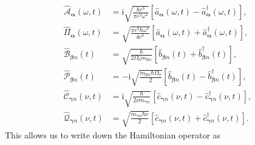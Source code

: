 \documentclass{article}
\begin{document}
\begin{equation}
\begin{split}
\hat{\mathcal{A}}_{\bm{\alpha}}(\omega,t) &= \mathrm{i}\sqrt{\frac{\hbar c^3}{\pi e^2\omega^2}}\left[\hat{a}_{\bm{\alpha}}(\omega,t) - \hat{a}_{\bm{\alpha}}^\dagger(\omega,t)\right],\\
\hat{\mathit{\Pi}}_{\bm{\alpha}}(\omega,t) &= \sqrt{\frac{\pi e^2\hbar\omega^2}{4 c^3}}\left[\hat{a}_{\bm{\alpha}}(\omega,t) + \hat{a}_{\bm{\alpha}}^\dagger(\omega,t)\right],\\[0.5em]
\hat{\mathcal{B}}_{\bm{\beta}n}(t) &= \sqrt{\frac{\hbar}{2\Omega_0m_{\bm{\beta}n}}}\left[\hat{b}_{\bm{\beta}n}(t) + \hat{b}_{\bm{\beta}n}^\dagger(t)\right],\\
\hat{\mathcal{P}}_{\bm{\beta}n}(t) &= -\mathrm{i}\sqrt{\frac{m_{\bm{\beta}n}\hbar\Omega_0}{2}}\left[\hat{b}_{\bm{\beta}n}(t) - \hat{b}_{\bm{\beta}n}^\dagger(t)\right],\\[0.5em]
\hat{\mathcal{C}}_{\bm{\gamma}n}(\nu,t) &= \mathrm{i}\sqrt{\frac{\hbar}{2\nu m_{\bm{\gamma}n}}}\left[\hat{c}_{\bm{\gamma}n}(\nu,t) - \hat{c}_{\bm{\gamma}n}^\dagger(\nu,t)\right],\\
\hat{\mathcal{Q}}_{\bm{\gamma}n}(\nu,t) &= \sqrt{\frac{m_{\bm{\gamma}n}\hbar\nu}{2}}\left[\hat{c}_{\bm{\gamma}n}(\nu,t) + \hat{c}_{\bm{\gamma}n}^\dagger(\nu,t)\right].
\end{split}
\end{equation}
This allows us to write down the Hamiltonian operator as
\end{document}
